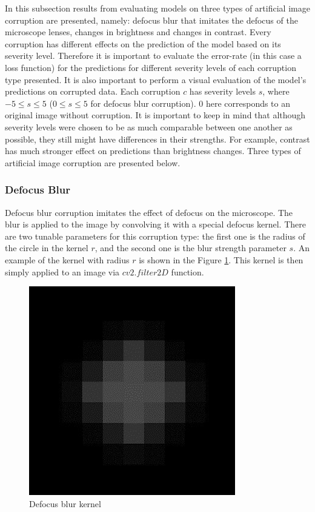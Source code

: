 
In this subsection results from evaluating models on three types of artificial image corruption are presented, namely: defocus blur that imitates the defocus of the microscope lenses, changes in brightness and changes in contrast. Every corruption  has different effects on the prediction of the model based on its severity level. Therefore it is important to evaluate the error-rate (in this case a loss function) for the predictions for different severity levels of each corruption type presented. It is also important to perform a visual evaluation of the model's predictions on corrupted data. Each corruption $c$ has severity levels $s$, where $-5 \leq s \leq 5$ ($0 \leq s \leq 5$ for defocus blur corruption). $0$ here corresponds to an original image without corruption. It is important to keep in mind that although severity levels were chosen to be as much comparable between one another as possible, they still might have differences in their strengths. For example, contrast has much stronger effect on predictions than brightness changes. Three types of artificial image corruption are presented below.

\subsubsection{Defocus Blur}
Defocus blur corruption imitates the effect of defocus on the microscope. The blur is applied to the image by convolving it with a special defocus kernel. There are two tunable parameters for this corruption type: the first one is the radius of the circle in the kernel $r$, and the second one is the blur strength parameter $s$. An example of the kernel with radius $r$ is shown in the Figure \ref{fig:defocus-blur-kernel}. This kernel is then simply applied to an image via $cv2.filter2D$ function.

\begin{figure}[htb]
	\begin{center}
		\includegraphics[width=0.2\linewidth]{bilder/stability/defocus-blur-kernel.png}
		\caption{Defocus blur kernel}\label{fig:defocus-blur-kernel}
	\end{center}
\end{figure}

